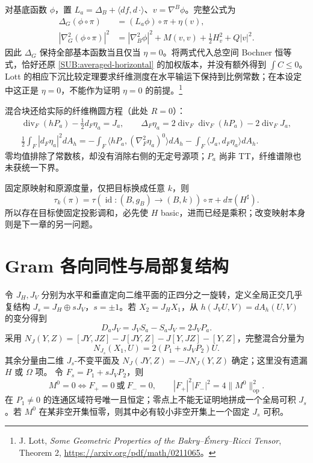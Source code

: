 \documentclass[UTF8,fontset=fandol,zihao=-4,oneside,openany]{ctexbook}
\theoremstyle{cjkplain}
\numberwithin{equation}{chapter}
\begin{document}
对基底函数 $\phi$，置 $L_a=\Delta_B+\langle df,d\,\cdot\rangle$、$v=\nabla^B\phi$。完整公式为
\begin{equation}\label{SUB:basic-functions}
\begin{aligned}
\Delta_G(\phi\circ\pi)&=(L_a\phi)\circ\pi+\eta(v),\\
|\nabla_G^2(\phi\circ\pi)|^2
&=|\nabla_B^2\phi|^2+M(v,v)+\tfrac12H_v^2+Q|v|^2.
\end{aligned}
\end{equation}
因此 $\Delta_G$ 保持全部基本函数当且仅当 $\eta=0$。将两式代入总空间 Bochner 恒等式，恰好还原 \eqref{SUB:averaged-horizontal} 的加权版本，并没有额外得到 $\int C\le0$。Lott 的相应下沉比较定理要求纤维测度在水平输运下保持到比例常数；在本设定中这正是 $\eta=0$，不能作为证明 $\eta=0$ 的前提。\footnote{J. Lott, \emph{Some Geometric Properties of the Bakry--Émery--Ricci Tensor}, Theorem 2, \url{https://arxiv.org/pdf/math/0211065}。}

混合块还给实际的纤维椭圆方程（此处 $R=0$）：
\begin{equation}\label{SUB:fibre-elliptic}
\begin{gathered}
\operatorname{div}_F(hP_a)-\tfrac12d_F\eta_a=J_a,\qquad
\Delta_F\eta_a=2\operatorname{div}_F\operatorname{div}_F(hP_a)
-2\operatorname{div}_FJ_a,\\
\tfrac12\int_F|d_F\eta_a|^2dA_h
=-\int_F\langle hP_a,(\nabla_F^2\eta_a)^0\rangle dA_h
-\int_F\langle J_a,d_F\eta_a\rangle dA_h.
\end{gathered}
\end{equation}
零均值排除了常数核，却没有消除右侧的无定号源项；$P_a$ 尚非 TT，纤维谱隙也未获统一下界。

固定原映射和原源度量，仅把目标换成任意 $k$，则
\begin{equation}\label{SUB:change-target}
\tau_k(\pi)=\tau(\operatorname{id}:(B,g_B)\to(B,k))\circ\pi+d\pi(H^\sharp).
\end{equation}
所以存在目标使固定投影调和，必先使 $H$ basic，进而已经是乘积；改变映射本身则是下一章的另一问题。

\section{Gram 各向同性与局部复结构}

令 $J_H,J_V$ 分别为水平和垂直定向二维平面的正四分之一旋转，定义全局正交几乎复结构 $J_s=J_H\oplus sJ_V$，$s=\pm1$。若 $X_2=J_HX_1$，从 $h(J_VU,V)=dA_h(U,V)$ 的变分得到
\[
D_aJ_V=J_VS_a-S_aJ_V=2J_VP_a.
\]
采用 $N_J(Y,Z)=[JY,JZ]-J[JY,Z]-J[Y,JZ]-[Y,Z]$，完整混合分量为
\begin{equation}\label{SUB:nijenhuis}
N_{J_s}(X_1,U)=2(P_1+sJ_VP_2)U.
\end{equation}
其余分量由二维 $J_s$-不变平面及 $N_J(JY,Z)=-JN_J(Y,Z)$ 确定；这里没有遗漏 $H$ 或 $\Omega$ 项。
令 $F_s=P_1+sJ_VP_2$，则
\begin{equation}\label{SUB:gram-nijenhuis}
M^0=0\iff F_+=0\ \text{或}\ F_-=0,
\qquad |F_+|^2|F_-|^2=4\|M^0\|_{\mathrm{op}}^2.
\end{equation}
在 $P_1\ne0$ 的连通区域符号唯一且恒定；零点上不能无证明地拼成一个全局可积 $J_s$。若 $M^0$ 在某非空开集恒零，则其中必有较小非空开集上一个固定 $J_s$ 可积。
\end{document}
